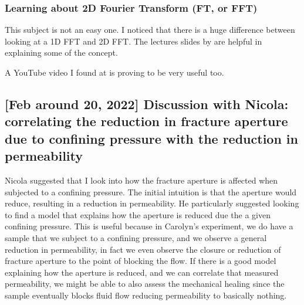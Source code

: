\documentclass[11pt,titlepage]{article}
\begin{document}
\subsubsection{Learning about 2D Fourier Transform (FT, or FFT)}
This subject is not an easy one. I noticed that there is a huge difference between looking at a 1D FFT and 2D FFT. The lectures slides by \citep{Zisserman2014} are helpful in explaining some of the concept.

A YouTube video I found at \cite{Cohen2017} is proving to be very useful too. 

\subsection{[Feb around 20, 2022] Discussion with Nicola: correlating the reduction in fracture aperture due to confining pressure with the reduction in permeability} Nicola suggested that I look into how the fracture aperture is affected when subjected to a confining pressure. The initial intuition is that the aperture would reduce, resulting in a reduction in permeability. He particularly suggested looking to find a model that explains how the aperture is reduced due the a given confining pressure. This is useful because in Carolyn's experiment, we do have a sample that we subject to a confining pressure, and we observe a general reduction in permeability, in fact we even observe the closure or reduction of fracture aperture to the point of blocking the flow. If there is a good model explaining how the aperture is reduced, and we can correlate that measured permeability, we might be able to also assess the mechanical healing since the sample eventually blocks fluid flow reducing permeability to basically nothing.
\end{document}

